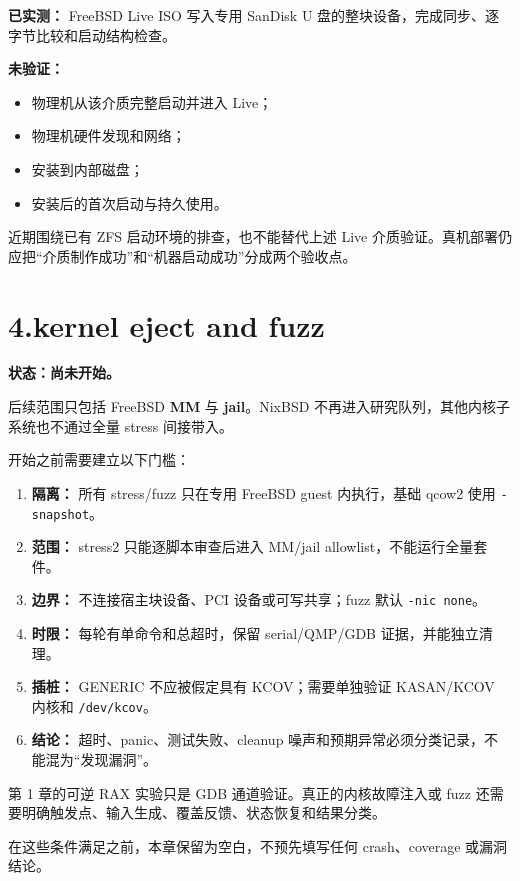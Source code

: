 \documentclass[
  11pt,
  UTF8,
  a4paper,
  fontset=fandol]{ctexart}
\newcommand{\passthrough}[1]{#1}
\providecommand{\tightlist}{%
  \setlength{\itemsep}{0pt}\setlength{\parskip}{0pt}}
\begin{document}
\textbf{已实测：} FreeBSD Live ISO 写入专用 SanDisk U
盘的整块设备，完成同步、逐字节比较和启动结构检查。

\textbf{未验证：}

\begin{itemize}
\tightlist
\item
  物理机从该介质完整启动并进入 Live；
\item
  物理机硬件发现和网络；
\item
  安装到内部磁盘；
\item
  安装后的首次启动与持久使用。
\end{itemize}

近期围绕已有 ZFS 启动环境的排查，也不能替代上述 Live
介质验证。真机部署仍应把``介质制作成功''和``机器启动成功''分成两个验收点。

\section{4.kernel eject and fuzz}\label{kernel-eject-and-fuzz}

\textbf{状态：尚未开始。}

后续范围只包括 FreeBSD \textbf{MM} 与 \textbf{jail}。NixBSD
不再进入研究队列，其他内核子系统也不通过全量 stress 间接带入。

开始之前需要建立以下门槛：

\begin{enumerate}
\def\labelenumi{\arabic{enumi}.}
\tightlist
\item
  \textbf{隔离：} 所有 stress/fuzz 只在专用 FreeBSD guest 内执行，基础
  qcow2 使用 \passthrough{\lstinline!-snapshot!}。
\item
  \textbf{范围：} stress2 只能逐脚本审查后进入 MM/jail
  allowlist，不能运行全量套件。
\item
  \textbf{边界：} 不连接宿主块设备、PCI 设备或可写共享；fuzz 默认
  \passthrough{\lstinline!-nic none!}。
\item
  \textbf{时限：} 每轮有单命令和总超时，保留 serial/QMP/GDB
  证据，并能独立清理。
\item
  \textbf{插桩：} GENERIC 不应被假定具有 KCOV；需要单独验证 KASAN/KCOV
  内核和 \passthrough{\lstinline!/dev/kcov!}。
\item
  \textbf{结论：} 超时、panic、测试失败、cleanup
  噪声和预期异常必须分类记录，不能混为``发现漏洞''。
\end{enumerate}

第 1 章的可逆 RAX 实验只是 GDB 通道验证。真正的内核故障注入或 fuzz
还需要明确触发点、输入生成、覆盖反馈、状态恢复和结果分类。

在这些条件满足之前，本章保留为空白，不预先填写任何 crash、coverage
或漏洞结论。
\end{document}
